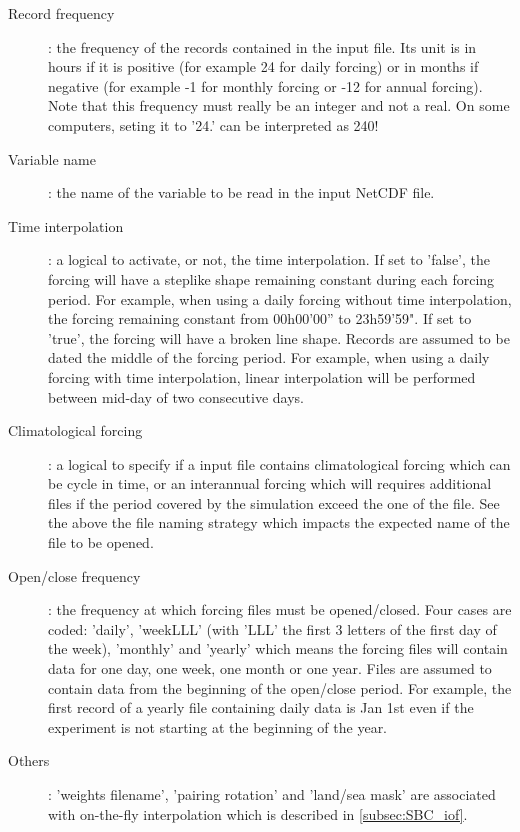 \documentclass[../tex_main/NEMO_manual]{subfiles}
\begin{document}
\begin{description}
\item[Record frequency]:
  the frequency of the records contained in the input file.
  Its unit is in hours if it is positive (for example 24 for daily forcing) or in months if negative
  (for example -1 for monthly forcing or -12 for annual forcing).
  Note that this frequency must really be an integer and not a real.
  On some computers, seting it to '24.' can be interpreted as 240!

\item[Variable name]:
  the name of the variable to be read in the input NetCDF file.

\item[Time interpolation]:
  a logical to activate, or not, the time interpolation.
  If set to 'false', the forcing will have a steplike shape remaining constant during each forcing period.
  For example, when using a daily forcing without time interpolation, the forcing remaining constant from
  00h00'00'' to 23h59'59".
  If set to 'true', the forcing will have a broken line shape.
  Records are assumed to be dated the middle of the forcing period.
  For example, when using a daily forcing with time interpolation,
  linear interpolation will be performed between mid-day of two consecutive days. 

\item[Climatological forcing]:
  a logical to specify if a input file contains climatological forcing which can be cycle in time,
  or an interannual forcing which will requires additional files if
  the period covered by the simulation exceed the one of the file.
  See the above the file naming strategy which impacts the expected name of the file to be opened. 

\item[Open/close frequency]:
  the frequency at which forcing files must be opened/closed.
  Four cases are coded:
  'daily', 'weekLLL' (with 'LLL' the first 3 letters of the first day of the week), 'monthly' and 'yearly' which
  means the forcing files will contain data for one day, one week, one month or one year.
  Files are assumed to contain data from the beginning of the open/close period.
  For example, the first record of a yearly file containing daily data is Jan 1st even if
  the experiment is not starting at the beginning of the year. 

\item[Others]:
  'weights filename', 'pairing rotation' and 'land/sea mask' are associated with
  on-the-fly interpolation which is described in \autoref{subsec:SBC_iof}.

\end{description}
\end{document}
